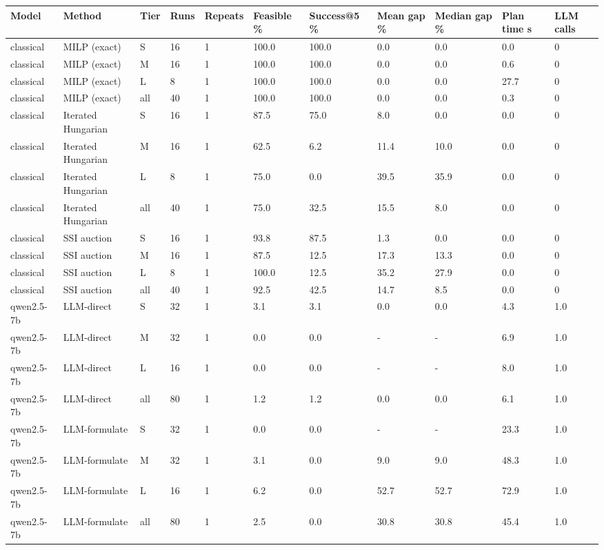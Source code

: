 \begin{tabular}{lllllllllll}
\toprule
Model & Method & Tier & Runs & Repeats & Feasible \% & Success@5 \% & Mean gap \% & Median gap \% & Plan time s & LLM calls \\
\midrule
classical & MILP (exact) & S & 16 & 1 & 100.0 & 100.0 & 0.0 & 0.0 & 0.0 & 0 \\
classical & MILP (exact) & M & 16 & 1 & 100.0 & 100.0 & 0.0 & 0.0 & 0.6 & 0 \\
classical & MILP (exact) & L & 8 & 1 & 100.0 & 100.0 & 0.0 & 0.0 & 27.7 & 0 \\
classical & MILP (exact) & all & 40 & 1 & 100.0 & 100.0 & 0.0 & 0.0 & 0.3 & 0 \\
classical & Iterated Hungarian & S & 16 & 1 & 87.5 & 75.0 & 8.0 & 0.0 & 0.0 & 0 \\
classical & Iterated Hungarian & M & 16 & 1 & 62.5 & 6.2 & 11.4 & 10.0 & 0.0 & 0 \\
classical & Iterated Hungarian & L & 8 & 1 & 75.0 & 0.0 & 39.5 & 35.9 & 0.0 & 0 \\
classical & Iterated Hungarian & all & 40 & 1 & 75.0 & 32.5 & 15.5 & 8.0 & 0.0 & 0 \\
classical & SSI auction & S & 16 & 1 & 93.8 & 87.5 & 1.3 & 0.0 & 0.0 & 0 \\
classical & SSI auction & M & 16 & 1 & 87.5 & 12.5 & 17.3 & 13.3 & 0.0 & 0 \\
classical & SSI auction & L & 8 & 1 & 100.0 & 12.5 & 35.2 & 27.9 & 0.0 & 0 \\
classical & SSI auction & all & 40 & 1 & 92.5 & 42.5 & 14.7 & 8.5 & 0.0 & 0 \\
qwen2.5-7b & LLM-direct & S & 32 & 1 & 3.1 & 3.1 & 0.0 & 0.0 & 4.3 & 1.0 \\
qwen2.5-7b & LLM-direct & M & 32 & 1 & 0.0 & 0.0 & - & - & 6.9 & 1.0 \\
qwen2.5-7b & LLM-direct & L & 16 & 1 & 0.0 & 0.0 & - & - & 8.0 & 1.0 \\
qwen2.5-7b & LLM-direct & all & 80 & 1 & 1.2 & 1.2 & 0.0 & 0.0 & 6.1 & 1.0 \\
qwen2.5-7b & LLM-formulate & S & 32 & 1 & 0.0 & 0.0 & - & - & 23.3 & 1.0 \\
qwen2.5-7b & LLM-formulate & M & 32 & 1 & 3.1 & 0.0 & 9.0 & 9.0 & 48.3 & 1.0 \\
qwen2.5-7b & LLM-formulate & L & 16 & 1 & 6.2 & 0.0 & 52.7 & 52.7 & 72.9 & 1.0 \\
qwen2.5-7b & LLM-formulate & all & 80 & 1 & 2.5 & 0.0 & 30.8 & 30.8 & 45.4 & 1.0 \\

\end{tabular}
